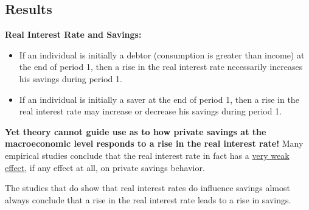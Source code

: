 \documentclass[10pt]{article}
\begin{document}
\subsection{Results}
{\textbf {Real Interest Rate and Savings:}}
\begin{itemize}
\item 
		If an individual is initially a debtor (consumption is greater than income) at the end of period 
		1, then a rise in the real interest rate necessarily increases his savings during period 1.
\item 
		If an individual is initially a saver at the end of period 1, then a rise in the real interest
		rate may increase or decrease his savings during period 1.
\end{itemize}
{\textbf {Yet theory cannot guide use as to how private savings at the macroeconomic level
responds to a rise in the real interest rate!}}
Many empirical studies conclude that the real interest rate in fact has a {\underline {very weak 
effect}}, if any effect at all, on private savings behavior.

The studies that do show that real interest rates do influence savings almost always conclude that
a rise in the real interest rate leads to a rise in savings.





\end{document}
